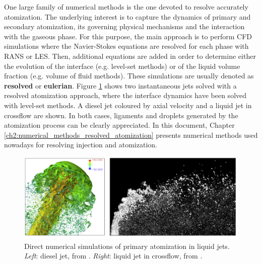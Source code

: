 One large family of numerical methods is the one devoted to resolve accurately atomization. The underlying interest is to capture the dynamics of primary and secondary atomization, its governing physical mechanisms and the interaction with the gaseous phase. For this purpose, the main approach is to perform CFD simulations where the Navier-Stokes equations are resolved for each phase with RANS or LES. Then, additional equations are added in order to determine either the evolution of the interface (e.g. level-set methods) or of the liquid volume fraction (e.g. volume of fluid methods). These simulations are usually denoted as \textbf{resolved} or \textbf{eulerian}. Figure \ref{fig:DNS_simulations_jets} shows two instantaneous jets solved with a resolved atomization approach, where the interface dynamics have been solved with level-set methods. A diesel jet coloured by axial velocity and a liquid jet in crossflow are shown. In both cases, ligaments and droplets generated by the atomization process can be clearly appreciated. In this document, Chapter \ref{ch2:numerical_methods_resolved_atomization} presents numerical methods used nowadays for resolving injection and atomization.

\begin{figure}[h!]
	\centering
   \includegraphics[scale=0.4]{./part0_intro/jets_DNS_simulations}
	\caption[Direct numerical simulations of primary atomization in liquid jets.]{Direct numerical simulations of primary atomization in liquid jets. \textsl{Left}: diesel jet, from . \textsl{Right}: liquid jet in crossflow, from .}
	\label{fig:DNS_simulations_jets}
\end{figure}

